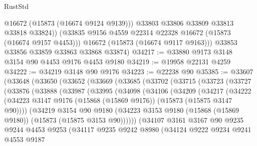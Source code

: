 \begin{lexlean}{RustStd}
\begin{coremodule}
              @16672
              (@15873 (@16674 @9124 @9139)))
            @33803
            @33806
            @33809
            @33813
            @33818
            @33824))
        (@33835 @9156 @4559 @22314 @22328 @16672 (@15873 (@16674 @9157 @4453)))
        @16672
        (@15873 (@16674 @9117 @9163)))
      @33853
      @33856
      @33859
      @33863
      @33868
      @33874)
@34217 := @33880 @9173 @3148 @3154 @90 @4453 @9176 @4453 @9180
@34219 := @19958 @22131 @4259
@34222 := @34219 @3148 @90 @9176
@34223 := @22238 @90
@35385 := @33607
    (@33648
      (@33650
        (@33652
          (@33669
            (@33685
              (@33702
                (@33715
                  (@33723
                    (@33727
                      (@33876
                        (@33888
                          (@33987
                            (@33995
                              (@34098
                                (@34106
                                  (@34209
                                    (@34217
                                      (@34222
                                        (@34223
                                          @3147
                                          @9176
                                          (@15868 (@15869 @9176))
                                          (@15873 (@15875 @3147 @90))))
                                      (@34219
                                        @3154
                                        @90
                                        @9180
                                        (@34223
                                          @3153
                                          @9180
                                          (@15868 (@15869 @9180))
                                          (@15873 (@15875 @3153 @90))))))
                                  (@34107
                                    @3161
                                    @3167
                                    @90
                                    @9235
                                    @9244
                                    @4453
                                    @9253
                                    (@34117
                                      @9235
                                      @9242
                                      @8980
                                      (@34124
                                        @9222
                                        @9234
                                        @9241
                                        @4553
                                        @9187

\end{coremodule}
\end{lexlean}
